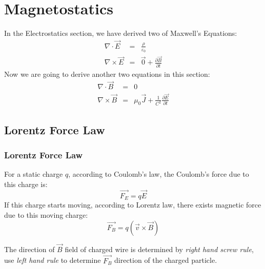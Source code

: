 \documentclass[12pt,a4paper,twoside]{article}
\begin{document}
\section{Magnetostatics}
    In the Electrostatics section, we have derived two of Maxwell's Equations:
    \begin{eqnarray*}
        \nabla \cdot \overrightarrow{E} &=& \frac{\rho}{\varepsilon_0}\\
        \nabla \times \overrightarrow{E} &=& \overrightarrow{0} +\frac{\partial\overrightarrow{B}}{\partial t}
    \end{eqnarray*}
    Now we are going to derive another two equations in this section:
    \begin{eqnarray*}
        \nabla \cdot \overrightarrow{B} &=& 0\\
        \nabla\times \overrightarrow{B} &=& \mu_0\overrightarrow{J}+\frac{1}{C^2}\frac{\partial\overrightarrow{E}}{\partial t}
    \end{eqnarray*}
    
\subsection{Lorentz Force Law}
\subsubsection{Lorentz Force Law}
    For a static charge $q$, according to Coulomb's law, the Coulomb's force due to this charge is:
    \[\overrightarrow{F_E}=q\overrightarrow{E}\]
    If this charge starts moving, according to Lorentz law, there exists magnetic force due to this moving charge:
    \begin{equation}
        \boxed{\overrightarrow{F_B}=q(\overrightarrow{v}\times\overrightarrow{B})}
        \label{eq:Lorentz Force}
    \end{equation}
    
    \noindent The direction of $\overrightarrow{B}$ field of charged wire is determined by \textit{right hand screw rule}, use \textit{left hand rule} to determine $\overrightarrow{F_B}$ direction of the charged particle.
    
\end{document}
